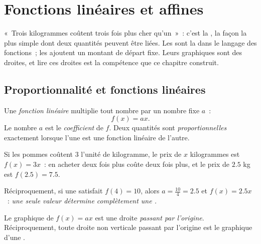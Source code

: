 \chapter{Fonctions linéaires et affines}\label{ch:g9:linfunc}

«~Trois kilogrammes coûtent trois fois plus cher qu'un~»~: c'est la
, la façon la plus simple dont deux quantités peuvent
être liées. Les  sont la  dans le
langage des fonctions~; les  ajoutent un montant de
départ fixe. Leurs graphiques sont des droites, et lire ces droites est
la compétence que ce chapitre construit.

\section{Proportionnalité et fonctions linéaires}

\begin{definition}\label{def:g9:linfunc:linear}
Une \emph{fonction linéaire} multiplie tout
nombre par un nombre fixe $a$~:
\[
f(x) = a x .
\]
Le nombre $a$ est le \emph{coefficient} de $f$. Deux quantités sont
\emph{proportionnelles} exactement lorsque l'une
est une fonction linéaire de l'autre.
\end{definition}

\begin{example}\label{ex:g9:linfunc:linear}
Si les pommes coûtent $3$ l'unité de kilogramme, le prix de $x$
kilogrammes est $f(x) = 3x$~: en acheter deux fois plus coûte deux fois
plus, et le prix de $2.5$ kg est $f(2.5) = 7.5$.

Réciproquement, si une  satisfait $f(4) = 10$, alors
$a = \frac{10}{4} = 2.5$ et $f(x) = 2.5x$~: \emph{une seule valeur
détermine complètement une .}
\end{example}

\begin{proposition}\label{prop:g9:linfunc:lineargraph}
Le graphique de $f(x) = ax$ est une droite \emph{passant par l'origine}.
Réciproquement, toute droite non verticale passant par l'origine est le
graphique d'une .
\end{proposition}
\admitted

